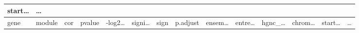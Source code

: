 \documentclass[
]{article}
\begin{document}
\begin{longtable}[]{@{}llllllllllllll@{}}
\begin{minipage}[b]{0.05\columnwidth}
start\ldots{}\strut
\end{minipage} & \begin{minipage}[b]{0.02\columnwidth}\raggedright
\ldots{}\strut
\end{minipage}\tabularnewline
\midrule
\endfirsthead
\toprule
\begin{minipage}[b]{0.05\columnwidth}\raggedright
gene\strut
\end{minipage} & \begin{minipage}[b]{0.04\columnwidth}\raggedright
module\strut
\end{minipage} & \begin{minipage}[b]{0.04\columnwidth}\raggedright
cor\strut
\end{minipage} & \begin{minipage}[b]{0.04\columnwidth}\raggedright
pvalue\strut
\end{minipage} & \begin{minipage}[b]{0.05\columnwidth}\raggedright
-log2\ldots{}\strut
\end{minipage} & \begin{minipage}[b]{0.05\columnwidth}\raggedright
signi\ldots{}\strut
\end{minipage} & \begin{minipage}[b]{0.03\columnwidth}\raggedright
sign\strut
\end{minipage} & \begin{minipage}[b]{0.05\columnwidth}\raggedright
p.adjust\strut
\end{minipage} & \begin{minipage}[b]{0.05\columnwidth}\raggedright
ensem\ldots{}\strut
\end{minipage} & \begin{minipage}[b]{0.05\columnwidth}\raggedright
entre\ldots{}\strut
\end{minipage} & \begin{minipage}[b]{0.05\columnwidth}\raggedright
hgnc\_\ldots{}\strut
\end{minipage} & \begin{minipage}[b]{0.05\columnwidth}\raggedright
chrom\ldots{}\strut
\end{minipage} & \begin{minipage}[b]{0.05\columnwidth}\raggedright
start\ldots{}\strut
\end{minipage} & \begin{minipage}[b]{0.02\columnwidth}\raggedright
\ldots{}\strut
\end{minipage}\tabularnewline
\midrule
\endhead

\end{longtable}
\end{document}
